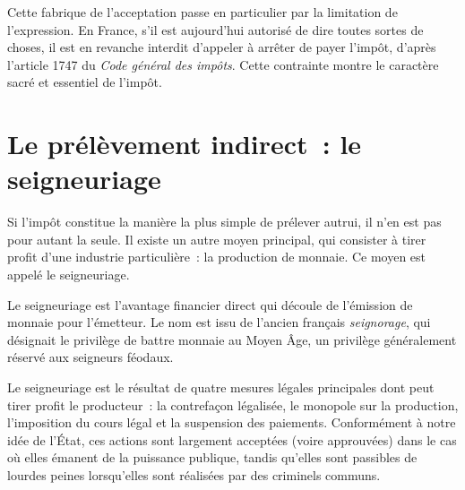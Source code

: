Cette fabrique de l'acceptation passe en particulier par la limitation de l'expression. En France, s'il est aujourd'hui autorisé de dire toutes sortes de choses, il est en revanche interdit d'appeler à arrêter de payer l'impôt, d'après l'article 1747 du \emph{Code général des impôts}. Cette contrainte montre le caractère sacré et essentiel de l'impôt. %

\section*{Le prélèvement indirect~: le seigneuriage}

Si l'impôt constitue la manière la plus simple de prélever autrui, il n'en est pas pour autant la seule. Il existe un autre moyen principal, qui consister à tirer profit d'une industrie particulière~: la production de monnaie. Ce moyen est appelé le seigneuriage.

Le seigneuriage est l'avantage financier direct qui découle de l'émission de monnaie pour l'émetteur. Le nom est issu de l'ancien français \emph{seignorage}, qui désignait le privilège de battre monnaie au Moyen Âge, un privilège généralement réservé aux seigneurs féodaux.


Le seigneuriage est le résultat de quatre mesures légales principales dont peut tirer profit le producteur~: la contrefaçon légalisée, le monopole sur la production, l'imposition du cours légal et la suspension des paiements. Conformément à notre idée de l'État, ces actions sont largement acceptées (voire approuvées) dans le cas où elles émanent de la puissance publique, tandis qu'elles sont passibles de lourdes peines lorsqu'elles sont réalisées par des criminels communs.

